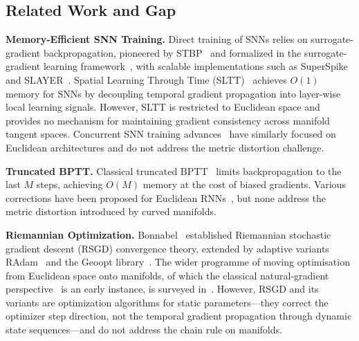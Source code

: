 \documentclass[a4paper,fleqn]{cas-dc}
\begin{document}
\subsection{Related Work and Gap}

\textbf{Memory-Efficient SNN Training.} Direct training of SNNs relies on surrogate-gradient backpropagation, pioneered by STBP~\citep{Wu18STBP} and formalized in the surrogate-gradient learning framework~\citep{Neftci19}, with scalable implementations such as SuperSpike~\citep{Zenke18} and SLAYER~\citep{Shrestha18}. Spatial Learning Through Time (SLTT)~\citep{Meng23SLTT} achieves $O(1)$ memory for SNNs by decoupling temporal gradient propagation into layer-wise local learning signals. However, SLTT is restricted to Euclidean space and provides no mechanism for maintaining gradient consistency across manifold tangent spaces. Concurrent SNN training advances~\citep{Fang21,Deng21,Eshraghian23,Zheng21,Roy19} have similarly focused on Euclidean architectures and do not address the metric distortion challenge.

\textbf{Truncated BPTT.} Classical truncated BPTT~\citep{Williams90} limits backpropagation to the last $M$ steps, achieving $O(M)$ memory at the cost of biased gradients. Various corrections have been proposed for Euclidean RNNs~\citep{Tallec17,Kag19}, but none address the metric distortion introduced by curved manifolds.

\textbf{Riemannian Optimization.} Bonnabel~\citep{Bonnabel13} established Riemannian stochastic gradient descent (RSGD) convergence theory, extended by adaptive variants RAdam~\citep{Becigneul19} and the Geoopt library~\citep{Kochurov20}. The wider programme of moving optimisation from Euclidean space onto manifolds, of which the classical natural-gradient perspective~\citep{Amari98} is an early instance, is surveyed in~\citep{Fei23}. However, RSGD and its variants are optimization algorithms for static parameters---they correct the optimizer step direction, not the temporal gradient propagation through dynamic state sequences---and do not address the chain rule on manifolds.
\end{document}
